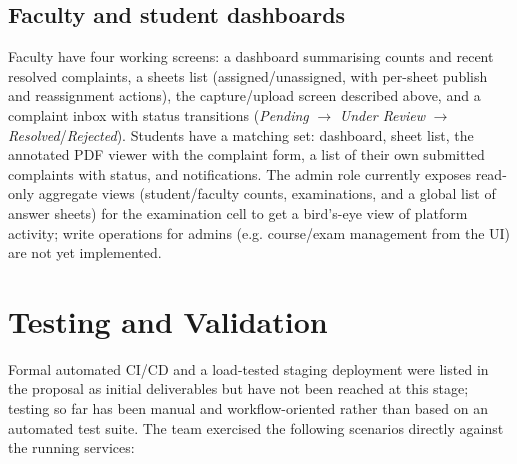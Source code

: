 \documentclass[11pt,a4paper]{article}
\begin{document}
\subsection{Faculty and student dashboards}

Faculty have four working screens: a dashboard summarising counts and recent
resolved complaints, a sheets list (assigned/unassigned, with per-sheet
publish and reassignment actions), the capture/upload screen described
above, and a complaint inbox with status transitions
(\emph{Pending} $\to$ \emph{Under Review} $\to$ \emph{Resolved}/\emph{Rejected}).
Students have a matching set: dashboard, sheet list, the annotated PDF
viewer with the complaint form, a list of their own submitted complaints
with status, and notifications. The admin role currently exposes read-only
aggregate views (student/faculty counts, examinations, and a global list of
answer sheets) for the examination cell to get a bird's-eye view of platform
activity; write operations for admins (e.g. course/exam management from the
UI) are not yet implemented.

\section{Testing and Validation}
\label{sec:testing}

Formal automated CI/CD and a load-tested staging deployment were listed in
the proposal as initial deliverables but have not been reached at this
stage; testing so far has been manual and workflow-oriented rather than
based on an automated test suite. The team exercised the following
scenarios directly against the running services:
\end{document}
